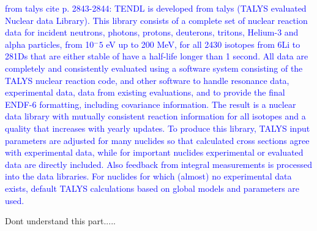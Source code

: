 \textcolor{blue}{from talys cite p. 2843-2844: TENDL is developed from talys (TALYS evaluated Nuclear data Library).  This
library consists of a complete set of nuclear reaction data
for incident neutrons, photons, protons, deuterons, tritons, Helium-3 and alpha particles, from 10$^−5$ eV up to 200 MeV, for all 2430 isotopes from 6Li to 281Ds that are either stable of have a half-life longer than 1 second.
All data are completely and consistently evaluated using a software system consisting of the TALYS nuclear reaction code, and other software to handle resonance data, experimental data, data from existing evaluations,
and to provide the final ENDF-6 formatting, including
covariance information. The result is a nuclear data library with mutually consistent reaction information for
all isotopes and a quality that increases with yearly updates.  To produce this library, TALYS input parameters are
adjusted for many nuclides so that calculated cross sections agree with experimental data, while for important
nuclides experimental or evaluated data are directly included. Also feedback from integral measurements is
processed into the data libraries. For nuclides for which
(almost) no experimental data exists, default TALYS
calculations based on global models and parameters are
used.}


Dont understand this part..... 